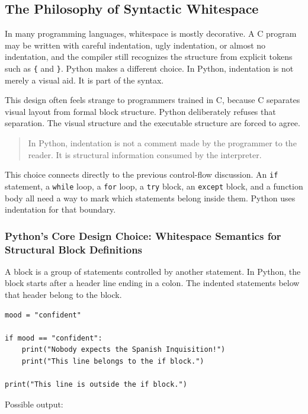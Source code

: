 \subsection{The Philosophy of Syntactic Whitespace}

In many programming languages, whitespace is mostly decorative. A C program may be written with careful indentation, ugly indentation, or almost no indentation, and the compiler still recognizes the structure from explicit tokens such as \texttt{\{} and \texttt{\}}. Python makes a different choice. In Python, indentation is not merely a visual aid. It is part of the syntax.

This design often feels strange to programmers trained in C, because C separates visual layout from formal block structure. Python deliberately refuses that separation. The visual structure and the executable structure are forced to agree.

\begin{quote}
In Python, indentation is not a comment made by the programmer to the reader. It is structural information consumed by the interpreter.
\end{quote}

This choice connects directly to the previous control-flow discussion. An \texttt{if} statement, a \texttt{while} loop, a \texttt{for} loop, a \texttt{try} block, an \texttt{except} block, and a function body all need a way to mark which statements belong inside them. Python uses indentation for that boundary.

\subsubsection{Python’s Core Design Choice: Whitespace Semantics for Structural Block Definitions}

A block is a group of statements controlled by another statement. In Python, the block starts after a header line ending in a colon. The indented statements below that header belong to the block.

\begin{verbatim}
mood = "confident"

if mood == "confident":
    print("Nobody expects the Spanish Inquisition!")
    print("This line belongs to the if block.")

print("This line is outside the if block.")
\end{verbatim}

Possible output:

